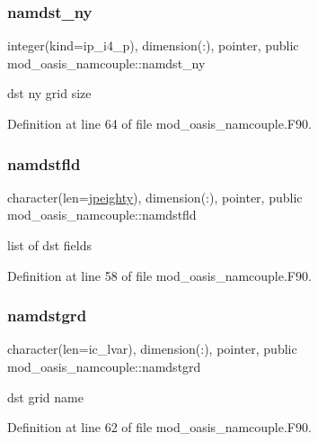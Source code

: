 \subsubsection{\texorpdfstring{namdst\+\_\+ny}{namdst\_ny}}
{\footnotesize\ttfamily integer(kind=ip\+\_\+i4\+\_\+p), dimension(\+:), pointer, public mod\+\_\+oasis\+\_\+namcouple\+::namdst\+\_\+ny}



dst ny grid size 



Definition at line 64 of file mod\+\_\+oasis\+\_\+namcouple.\+F90.

\mbox{\label{namespacemod__oasis__namcouple_ac4cfec209e4169b6098f9a8b9be1ffb1}} 
\subsubsection{\texorpdfstring{namdstfld}{namdstfld}}
{\footnotesize\ttfamily character(len=\hyperlink{namespacemod__oasis__namcouple_a4fb10ad6e864dcbe34c4a8b02204a523}{jpeighty}), dimension(\+:), pointer, public mod\+\_\+oasis\+\_\+namcouple\+::namdstfld}



list of dst fields 



Definition at line 58 of file mod\+\_\+oasis\+\_\+namcouple.\+F90.

\mbox{\label{namespacemod__oasis__namcouple_a7a2ed64b0670db38d2287f5d452060e4}} 
\subsubsection{\texorpdfstring{namdstgrd}{namdstgrd}}
{\footnotesize\ttfamily character(len=ic\+\_\+lvar), dimension(\+:), pointer, public mod\+\_\+oasis\+\_\+namcouple\+::namdstgrd}



dst grid name 



Definition at line 62 of file mod\+\_\+oasis\+\_\+namcouple.\+F90.

